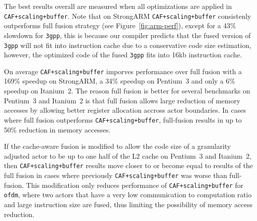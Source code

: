 

The best results overall are measured when all optimizations are
applied in \texttt{CAF+scaling+buffer}. Note that on StrongARM
\texttt{CAF+scaling+buffer} consistenly outperforms full fusion
strategy (see Figure~\ref{fig:arm-perf}), except for a 43\% slowdown 
for \texttt{3gpp}, this is because our compiler predicts that the
fused version of \texttt{3gpp} will not fit into instruction cache 
due to a conservative code size estimation, however, the optimized code 
of the fused \texttt{3gpp} fits into 16kb instruction cache.


On average \texttt{CAF+scaling+buffer} imporves performance over full 
fusion with a 169\% speedup on StrongARM, a 34\% speedup on Pentium~3 
and only a 6\% speedup on Itanium~2. The reason full fusion is better
for several benchmarks on Pentium~3 and Itanium~2 is that 
full fusion allows large reduction of memory accesses by allowing better 
register allocation accross actor boundaries. In cases where full fusion 
outperforms \texttt{CAF+scaling+buffer}, full-fusion results in up to 50\% 
reduction in memory accesses.


If the cache-aware fusion is modified to allow the code size of a 
granularity adjusted actor to be up to one half of the L2 cache on 
Pentium~3 and Itanium~2, then \texttt{CAF+scaling+buffer} results
move closer to or become equal to results of the full fusion in cases where
previously \texttt{CAF+scaling+buffer} was worse than full-fusion.
This modification only reduces performance of \texttt{CAF+scaling+buffer}
for \texttt{ofdm}, where two actors that have a very low communication 
to computation ratio and large instruction size are fused, thus 
limiting the possibility of memory access reduction. 





